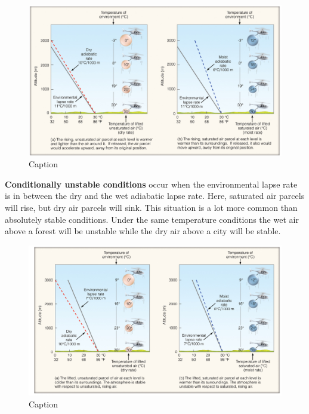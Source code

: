 \documentclass[12pt,oneside]{book}
\begin{document}
\begin{figure}

{\centering \includegraphics[width=1\linewidth]{figures/Figure39} 

}

\caption{Caption}\label{fig:heli}
\end{figure}

\textbf{Conditionally unstable conditions} occur when the environmental
lapse rate is in between the dry and the wet adiabatic lapse rate. Here,
saturated air parcels will rise, but dry air parcels will sink. This
situation is a lot more common than absolutely stable conditions. Under
the same temperature conditions the wet air above a forest will be
unstable while the dry air above a city will be stable.

\begin{figure}

{\centering \includegraphics[width=1\linewidth]{figures/Figure310} 

}

\caption{Caption}\label{fig:heli2}
\end{figure}
\end{document}
